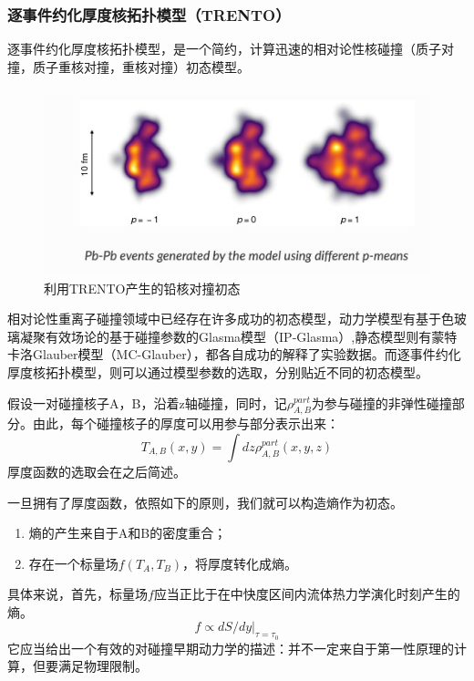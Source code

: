 \documentclass[aps,pre,12pt,preprint,onecolumn,showpacs,showkeys]{revtex4-1}
\begin{document}
\subsubsection{逐事件约化厚度核拓扑模型（TRENTO）}
逐事件约化厚度核拓扑模型\cite{PhysRevC.92.011901}，是一个简约，计算迅速的相对论性核碰撞（质子对撞，质子重核对撞，重核对撞）初态模型。
\begin{figure}[htbp]
\centering
\includegraphics[width=140mm]{trento}
\caption{利用TRENTO产生的铅核对撞初态\label{fig:trento}}%
\end{figure}
\par
相对论性重离子碰撞领域中已经存在许多成功的初态模型，动力学模型有基于色玻璃凝聚有效场论的基于碰撞参数的Glasma模型（IP-Glasma）,静态模型则有蒙特卡洛Glauber模型（MC-Glauber），都各自成功的解释了实验数据。而逐事件约化厚度核拓扑模型，则可以通过模型参数的选取，分别贴近不同的初态模型。
\par
假设一对碰撞核子A，B，沿着z轴碰撞，同时，记$\rho_{A,B}^{part}$为参与碰撞的非弹性碰撞部分。由此，每个碰撞核子的厚度可以用参与部分表示出来：
\begin{equation}
    T_{A,B}(x,y)=\int dz \rho_{A,B}^{part}(x,y,z)
\end{equation}
厚度函数的选取会在之后简述。\par
一旦拥有了厚度函数，依照如下的原则，我们就可以构造熵作为初态。
\begin{enumerate}
    \item 熵的产生来自于A和B的密度重合；
    \item 存在一个标量场$f(T_A,T_B)$，将厚度转化成熵。
\end{enumerate}
具体来说，首先，标量场$f$应当正比于在中快度区间内流体热力学演化时刻产生的熵。
\begin{equation}
    f\propto dS/dy|_{\tau=\tau_0}
\end{equation}
它应当给出一个有效的对碰撞早期动力学的描述：并不一定来自于第一性原理的计算，但要满足物理限制。
\end{document}
